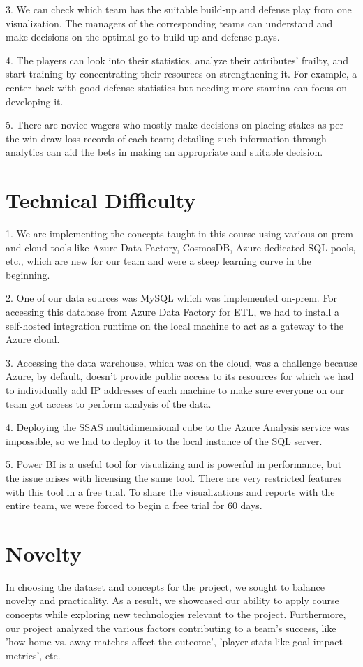 \documentclass[lettersize]{IEEEtran}
\begin{document}
3. We can check which team has the suitable build-up and defense play from one visualization. The managers of the corresponding teams can understand and make decisions on the optimal go-to build-up and defense plays. 

4. The players can look into their statistics, analyze their attributes' frailty, and start training by concentrating their resources on strengthening it. For example, a center-back with good defense statistics but needing more stamina can focus on developing it.

5. There are novice wagers who mostly make decisions on placing stakes as per the win-draw-loss records of each team; detailing such information through analytics can aid the bets in making an appropriate and suitable decision. 

\section{\textbf{Technical Difficulty}}
1. We are implementing the concepts taught in this course using various on-prem and cloud tools like Azure Data Factory, CosmosDB, Azure dedicated SQL pools, etc., which are new for our team and were a steep learning curve in the beginning.

2. One of our data sources was MySQL which was implemented on-prem. For accessing this database from Azure Data Factory for ETL, we had to install a self-hosted integration runtime on the local machine to act as a gateway to the Azure cloud.

3. Accessing the data warehouse, which was on the cloud, was a challenge because Azure, by default, doesn’t provide public access to its resources for which we had to individually add IP addresses of each machine to make sure everyone on our team got access to perform analysis of the data.

4. Deploying the SSAS multidimensional cube to the Azure Analysis service was impossible, so we had to deploy it to the local instance of the SQL server.

5. Power BI is a useful tool for visualizing and is powerful in performance, but the issue arises with licensing the same tool. There are very restricted features with this tool in a free trial. To share the visualizations and reports with the entire team, we were forced to begin a free trial for 60 days. 

\section{\textbf{Novelty}}
\vspace{-0.5\baselineskip}
In choosing the dataset and concepts for the project, we sought to balance novelty and practicality. As a result, we showcased our ability to apply course concepts while exploring new technologies relevant to the project. Furthermore, our project analyzed the various factors contributing to a team's success, like 'how home vs. away matches affect the outcome', 'player stats like goal impact metrics', etc.
\end{document}
